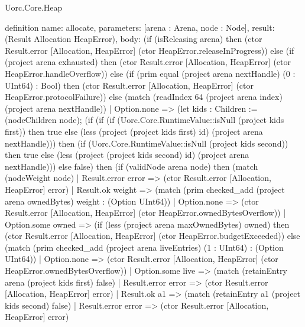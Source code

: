 \begin{lexlean}{Uorc.Core.Heap}
\begin{semanticmodule}
definition{
  name: allocate,
  parameters: [arena : Arena, node : Node],
  result: (Result Allocation HeapError),
  body: (if (isReleasing arena) then (ctor Result.error [Allocation, HeapError] (ctor HeapError.releaseInProgress)) else (if (project arena exhausted) then (ctor Result.error [Allocation, HeapError] (ctor HeapError.handleOverflow)) else (if (prim equal (project arena nextHandle) (0 : UInt64) : Bool) then (ctor Result.error [Allocation, HeapError] (ctor HeapError.protocolFailure)) else (match (readIndex 64 (project arena index) (project arena nextHandle))
    | Option.none => (let kids : Children := (nodeChildren node); (if (if (if (Uorc.Core.RuntimeValue::isNull (project kids first)) then true else (less (project (project kids first) id) (project arena nextHandle))) then (if (Uorc.Core.RuntimeValue::isNull (project kids second)) then true else (less (project (project kids second) id) (project arena nextHandle))) else false) then (if (validNode arena node) then (match (nodeWeight node)
      | Result.error error => (ctor Result.error [Allocation, HeapError] error)
      | Result.ok weight => (match (prim checked_add (project arena ownedBytes) weight : (Option UInt64))
        | Option.none => (ctor Result.error [Allocation, HeapError] (ctor HeapError.ownedBytesOverflow))
        | Option.some owned => (if (less (project arena maxOwnedBytes) owned) then (ctor Result.error [Allocation, HeapError] (ctor HeapError.budgetExceeded)) else (match (prim checked_add (project arena liveEntries) (1 : UInt64) : (Option UInt64))
          | Option.none => (ctor Result.error [Allocation, HeapError] (ctor HeapError.ownedBytesOverflow))
          | Option.some live => (match (retainEntry arena (project kids first) false)
            | Result.error error => (ctor Result.error [Allocation, HeapError] error)
            | Result.ok a1 => (match (retainEntry a1 (project kids second) false)
              | Result.error error => (ctor Result.error [Allocation, HeapError] error)
}
\end{semanticmodule}
\end{lexlean}
